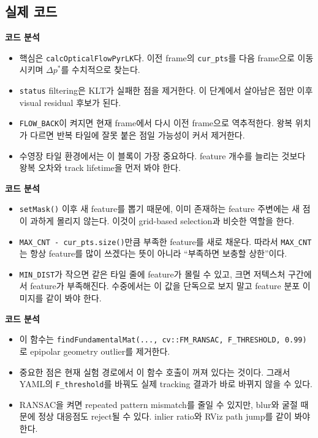 \documentclass[11pt,a4paper]{article}
\newcommand{\code}[1]{\texttt{#1}}
\newcommand{\codeheading}[1]{\par\vspace{6pt}\noindent{\footnotesize\bfseries\textcolor{codeemph}{#1}}\par\vspace{2pt}}
\newcommand{\readpoint}[1]{\par\noindent{\footnotesize\textcolor{muted}{읽는 포인트: #1}}\par\vspace{2pt}}
\newenvironment{codeanalysis}{%
  \par\vspace{2pt}\noindent
  {\footnotesize\bfseries\textcolor{accentblue}{코드 분석}}\par
  \begin{itemize}[leftmargin=1.35em,topsep=2pt,itemsep=1pt,parsep=0pt]
  \footnotesize
}{%
  \end{itemize}
  \vspace{6pt}
}
\begin{document}
\subsection*{실제 코드}

\readpoint{여기서 실제 KLT 추적, track status filtering, forward-backward check가 한 번에 보인다.}
\codeheading{feature\_tracker.cpp:120--149}

\begin{codeanalysis}
  \item 핵심은 \code{calcOpticalFlowPyrLK}다. 이전 frame의 \code{cur\_pts}를 다음 frame으로 이동시키며 \(\Delta p^*\)를 수치적으로 찾는다.
  \item \code{status} filtering은 KLT가 실패한 점을 제거한다. 이 단계에서 살아남은 점만 이후 visual residual 후보가 된다.
  \item \code{FLOW\_BACK}이 켜지면 현재 frame에서 다시 이전 frame으로 역추적한다. 왕복 위치가 다르면 반복 타일에 잘못 붙은 점일 가능성이 커서 제거한다.
  \item 수영장 타일 환경에서는 이 블록이 가장 중요하다. feature 개수를 늘리는 것보다 왕복 오차와 track lifetime을 먼저 봐야 한다.
\end{codeanalysis}

\codeheading{feature\_tracker.cpp:167--184}

\begin{codeanalysis}
  \item \code{setMask()} 이후 새 feature를 뽑기 때문에, 이미 존재하는 feature 주변에는 새 점이 과하게 몰리지 않는다. 이것이 grid-based selection과 비슷한 역할을 한다.
  \item \code{MAX\_CNT - cur\_pts.size()}만큼 부족한 feature를 새로 채운다. 따라서 \code{MAX\_CNT}는 항상 feature를 많이 쓰겠다는 뜻이 아니라 ``부족하면 보충할 상한''이다.
  \item \code{MIN\_DIST}가 작으면 같은 타일 줄에 feature가 몰릴 수 있고, 크면 저텍스처 구간에서 feature가 부족해진다. 수중에서는 이 값을 단독으로 보지 말고 feature 분포 이미지를 같이 봐야 한다.
\end{codeanalysis}

\codeheading{feature\_tracker.cpp:326--331}

\begin{codeanalysis}
  \item 이 함수는 \code{findFundamentalMat(..., cv::FM\_RANSAC, F\_THRESHOLD, 0.99)}로 epipolar geometry outlier를 제거한다.
  \item 중요한 점은 현재 실험 경로에서 이 함수 호출이 꺼져 있다는 것이다. 그래서 YAML의 \code{F\_threshold}를 바꿔도 실제 tracking 결과가 바로 바뀌지 않을 수 있다.
  \item RANSAC을 켜면 repeated pattern mismatch를 줄일 수 있지만, blur와 굴절 때문에 정상 대응점도 reject될 수 있다. inlier ratio와 RViz path jump를 같이 봐야 한다.
\end{codeanalysis}
\end{document}
